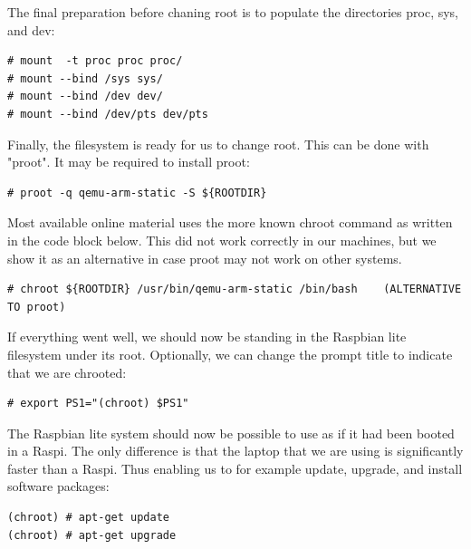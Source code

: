 The final preparation before chaning root is to populate the directories proc,
sys, and dev:

\begin{lstlisting}[]
# mount  -t proc proc proc/
# mount --bind /sys sys/
# mount --bind /dev dev/
# mount --bind /dev/pts dev/pts
\end{lstlisting}
\FloatBarrier
\vspace{-5mm}

Finally, the filesystem is ready for us to change root. This can be done with
"proot". It may be required to install proot:

\begin{lstlisting}[]
# proot -q qemu-arm-static -S ${ROOTDIR}
\end{lstlisting}
\FloatBarrier
\vspace{-5mm}

Most available online material uses the more known chroot command as written in
the code block below. This did not work correctly in our machines, but we show
it as an alternative in case proot may not work on other systems.

\begin{lstlisting}[]
# chroot ${ROOTDIR} /usr/bin/qemu-arm-static /bin/bash    (ALTERNATIVE TO proot)
\end{lstlisting}
\FloatBarrier
\vspace{-5mm}

If everything went well, we should now be standing in the Raspbian lite filesystem
under its root. Optionally, we can change the prompt title to indicate that we
are chrooted:

\begin{lstlisting}[]
# export PS1="(chroot) $PS1"
\end{lstlisting}
\FloatBarrier
\vspace{-5mm}

The Raspbian lite system should now be possible to use as if it had been booted
in a \ac{Raspi}. The only difference is that the laptop that we are using is
significantly faster than a \ac{Raspi}. Thus enabling us to for example update,
upgrade, and install software packages:

\begin{lstlisting}[]
(chroot) # apt-get update
(chroot) # apt-get upgrade
\end{lstlisting}
\FloatBarrier
\vspace{-5mm}

